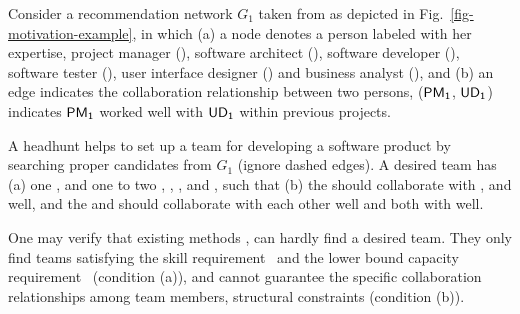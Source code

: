 \begin{example}
\label{exm-motivation}
Consider a recommendation network $G_1$ taken from \cite{TerveenM05} as depicted in Fig.~\ref{fig-motivation-example},
in which (a) a node denotes a person labeled with her expertise, \eg project manager (), software architect (), software developer (), software tester (),
user interface designer () and business analyst (),
and (b) an edge indicates the collaboration relationship between two persons, \eg (${\mathsf{PM_{1}}}$, ${\mathsf{UD_{1}}}$) indicates ${\mathsf{PM_{1}}}$ worked well with ${\mathsf{UD_{1}}}$ within previous projects.

A headhunt helps to set up a team for developing a software product by searching proper candidates from $G_1$ (ignore dashed edges).
A desired team has
(a) one , and one to two , , ,  and , such that
(b) the  should collaborate with ,  and  well, and the  and  should collaborate with each other well and both with  well.


One may verify that existing methods \cite{Lappas09,Kargar11,GajewarS12,realTeamForm13}, can hardly find a desired team.
They only find teams satisfying the skill requirement~\cite{Lappas09,Kargar11,GajewarS12} and the lower bound capacity requirement~\cite{GajewarS12,realTeamForm13}  (condition (a)), and cannot guarantee  the specific collaboration relationships among team members, \ie structural constraints (condition (b)).
 \end{example}

